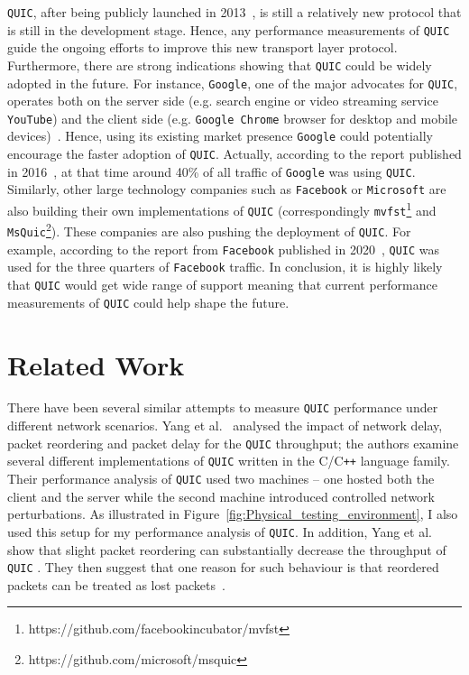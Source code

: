 \documentclass[12pt,a4paper,twoside,openright]{report}
\begin{document}
\texttt{QUIC}, after being publicly launched in 2013~\cite{Chromium_Blog_Experimenting_with_quic},  is still a relatively new protocol that is still in the development stage.
Hence, any performance measurements of \texttt{QUIC} guide the ongoing efforts to improve this new transport layer protocol.
Furthermore, there are strong indications showing that \texttt{QUIC} could be widely adopted in the future.
For instance, \texttt{Google}, one of the major advocates for \texttt{QUIC}, operates both on the server side (e.g. search engine or video streaming service \texttt{YouTube}) and the client side (e.g. \texttt{Google Chrome} browser for desktop and mobile devices)~\cite{A_QUICk_Introduction_to_HTTP3}.
Hence, using its existing market presence \texttt{Google} could potentially encourage the faster adoption of \texttt{QUIC}.
Actually, according to the report published in 2016~\cite{RuthJan2018AFLa}, at that time around 40\% of all traffic of \texttt{Google} was using \texttt{QUIC}.
Similarly, other large technology companies such as \texttt{Facebook} or \texttt{Microsoft} are also building their own implementations of \texttt{QUIC} (correspondingly \texttt{mvfst}\footnote{https://github.com/facebookincubator/mvfst} and \texttt{MsQuic}\footnote{https://github.com/microsoft/msquic}).
These companies are also pushing the deployment of \texttt{QUIC}. 
For example, according to the report from \texttt{Facebook} published in 2020~\cite{how-facebook-is-bringing-quic-to-billions}, \texttt{QUIC} was used for the three quarters of \texttt{Facebook} traffic. 
In conclusion, it is highly likely that \texttt{QUIC} would get wide range of support meaning that current performance measurements of \texttt{QUIC} could help shape the future.

\section{Related Work}
There have been several similar attempts to measure \texttt{QUIC} performance under different network scenarios. 
Yang et al.~\cite{Making_QUIC_Quicker} analysed the impact of network delay, packet reordering and packet delay for the \texttt{QUIC} throughput; the authors examine several different implementations of \texttt{QUIC} written in the C/C\texttt{++} language family.
Their performance analysis of \texttt{QUIC} used two machines -- one hosted both the client and the server while the second machine introduced controlled network perturbations.
As illustrated in Figure~\ref{fig:Physical_testing_environment}, I also used this setup for my performance analysis of \texttt{QUIC}.
In addition, Yang et al.~\cite{Making_QUIC_Quicker} show that slight packet reordering can substantially decrease the throughput of \texttt{QUIC} .
They then suggest that one reason for such behaviour is that reordered packets can be treated as lost packets~\cite{Making_QUIC_Quicker}. 
\end{document}

